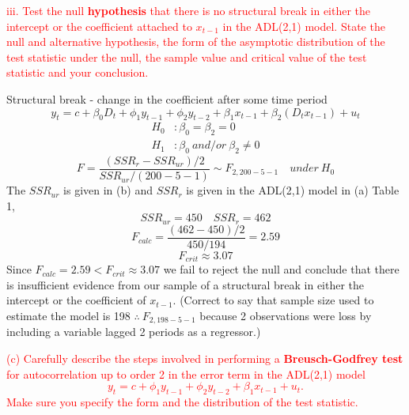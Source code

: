 \documentclass[12pt]{report}
\begin{document}
\noindent \textcolor{red}{iii. Test the null \textbf{hypothesis} that there is no structural break in either the intercept or the coefficient attached to $x_{t-1}$ in the ADL(2,1) model. State the null and alternative hypothesis, the form of the asymptotic distribution of the test statistic under the null, the sample value and critical value of the test statistic and your conclusion.}

\noindent Structural break - change in the coefficient after some time period $$y_t = c + \beta_0D_t + \phi_1y_{t-1} + \phi_2y_{t-2} + \beta_1x_{t-1} + \beta_2(D_tx_{t-1}) + u_t$$
\vspace{-\baselineskip}
\begin{align*}
	H_0&: \beta_0 = \beta_2 = 0 \\
	H_1&: \beta_0\ and/or\ \beta_2 \neq 0
\end{align*} \vspace{-\baselineskip} $$F = \dfrac{(SSR_r - SSR_{ur})/2}{SSR_{ur}/(200-5-1)} \sim F_{2,200-5-1} \quad under\ H_0$$ 
\noindent The $SSR_{ur}$ is given in (b) and $SSR_{r}$ is given in the ADL(2,1) model in (a) Table 1,
$$SSR_{ur} = 450 \quad SSR_{r} = 462$$
$$F_{calc} = \dfrac{(462 - 450)/2}{450/194} = 2.59$$ $$F_{crit} \approx 3.07$$
\noindent Since $F_{calc} = 2.59 < F_{crit} \approx 3.07$ we fail to reject the null and conclude that there is insufficient evidence from our sample of a structural break in either the intercept or the coefficient of $x_{t-1}$. (Correct to say that sample size used to estimate the model is 198 $\therefore\ F_{2,198-5-1}$ because 2 observations were loss by including a variable lagged 2 periods as a regressor.)

\noindent \textcolor{red}{(c) Carefully describe the steps involved in performing a \textbf{Breusch-Godfrey test} for autocorrelation up to order 2 in the error term in the ADL(2,1) model $$y_t = c + \phi_1 y_{t-1} + \phi_2 y_{t-2} + \beta_1 x_{t-1} + u_t.$$ Make sure you specify the form and the distribution of the test statistic.}
\end{document}
